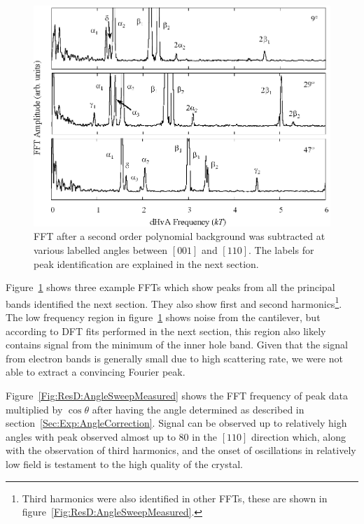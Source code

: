\begin{figure}[htbp]
    \begin{center}
        \includegraphics[scale=0.9]{Chapter-dHvABaFe2P2/Figures/AngleDepMeasurements/FFTExamples/FFTExamples}
        \caption{\ac{FFT} after a second order polynomial background was subtracted at various labelled angles between $[001]$ and $[110]$. The labels for peak identification are explained in the next section.}
        \label{Fig:ResD:FFTExamples}
    \end{center}
\end{figure}

Figure~\ref{Fig:ResD:FFTExamples} shows three example \acp{FFT} which show peaks from all the principal bands identified the next section. They also show first and second harmonics\footnote{Third harmonics were also identified in other \acp{FFT}, these are shown in figure~\ref{Fig:ResD:AngleSweepMeasured}.}. The low frequency region in figure~\ref{Fig:ResD:FFTExamples} shows noise from the cantilever, but according to \ac{DFT} fits performed in the next section, this region also likely contains signal from the minimum of the inner hole band. Given that the signal from electron bands is generally small due to high scattering rate, we were not able to extract a convincing Fourier peak.

Figure~\ref{Fig:ResD:AngleSweepMeasured} shows the \ac{FFT} frequency of peak data multiplied by $\cos\theta$ after having the angle determined as described in section~\ref{Sec:Exp:AngleCorrection}.  Signal can be observed up to relatively high angles with peak observed almost up to \unit{80}{\degree} in the $[110]$ direction which, along with the observation of third harmonics, and the onset of oscillations in relatively low field is testament to the high quality of the crystal.

